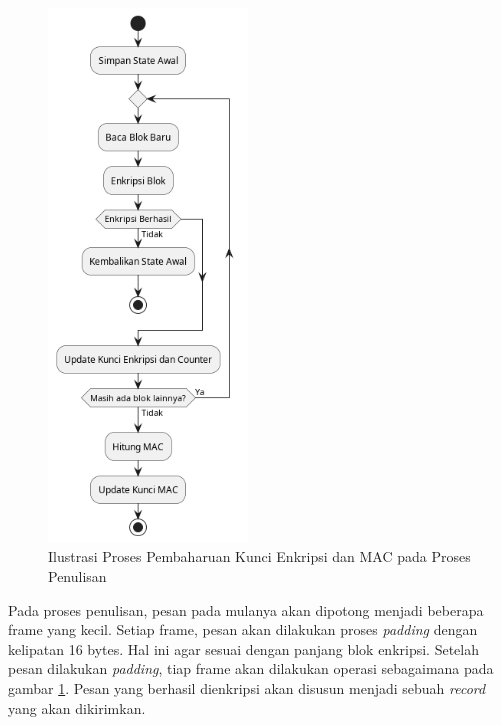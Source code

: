 \begin{figure}[!h]
  \centering
  \includegraphics[width=200px]{chapters/res/chapter-3/img/update.write.png}
  \caption{Ilustrasi Proses Pembaharuan Kunci Enkripsi dan MAC pada Proses Penulisan} \label{fig:tls.cipher.update.mac.write}
\end{figure}

Pada proses penulisan, pesan pada mulanya akan dipotong menjadi beberapa frame yang kecil. Setiap frame, pesan akan dilakukan proses \emph{padding} dengan kelipatan 16 bytes. Hal ini agar sesuai dengan panjang blok enkripsi. Setelah pesan dilakukan \emph{padding}, tiap frame akan dilakukan operasi sebagaimana pada gambar \ref{fig:tls.cipher.update.mac.write}. Pesan yang berhasil dienkripsi akan disusun menjadi sebuah \emph{record} yang akan dikirimkan.


